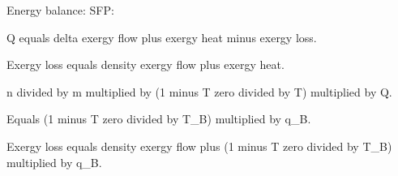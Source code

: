 Energy balance: SFP:  

Q equals delta exergy flow plus exergy heat minus exergy loss.  

Exergy loss equals density exergy flow plus exergy heat.  

n divided by m multiplied by (1 minus T zero divided by T) multiplied by Q.  

Equals (1 minus T zero divided by T_B) multiplied by q_B.  

Exergy loss equals density exergy flow plus (1 minus T zero divided by T_B) multiplied by q_B.